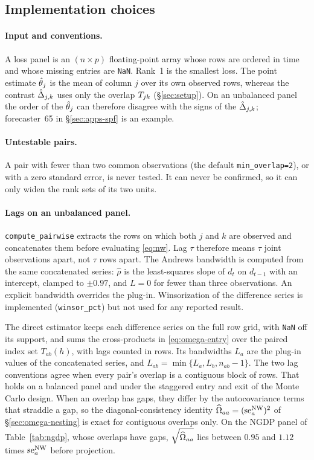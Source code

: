 \begin{appendix}
\tabImplCode

\section{Implementation choices}
\label{app:impl-details}

\paragraph{Input and conventions.} A loss panel is an $(n\times p)$ floating-point
array whose rows are ordered in time and whose missing entries are \texttt{NaN}. Rank~1
is the smallest loss. The point estimate $\hat{\theta}_j$ is the mean of column $j$ over
its own observed rows, whereas the contrast $\hat{\Delta}_{j,k}$ uses only the overlap
$T_{jk}$ (\S\ref{sec:setup}). On an unbalanced panel the order of the $\hat{\theta}_j$ can
therefore disagree with the signs of the $\hat{\Delta}_{j,k}$; forecaster~65 in
\S\ref{sec:apps-spf} is an example.

\paragraph{Untestable pairs.} A pair with fewer than two common observations (the
default \texttt{min\_overlap=2}), or with a zero standard error, is never tested. It
can never be confirmed, so it can only widen the rank sets of its two units.

\paragraph{Lags on an unbalanced panel.} \texttt{compute\_pairwise} extracts the rows
on which both $j$ and $k$ are observed and concatenates them before evaluating
\eqref{eq:nw}. Lag $\tau$ therefore means $\tau$ joint observations apart, not $\tau$
rows apart. The Andrews bandwidth is computed from the same concatenated series:
$\hat\rho$ is the least-squares slope of $d_t$ on $d_{t-1}$ with an intercept, clamped
to $\pm0.97$, and $L=0$ for fewer than three observations. An explicit bandwidth
overrides the plug-in. Winsorization of the difference series is implemented
(\texttt{winsor\_pct}) but not used for any reported result.

The direct estimator keeps each difference series on the full row grid, with
\texttt{NaN} off its support, and sums the cross-products in \eqref{eq:omega-entry} over
the paired index set $T_{ab}(h)$, with lags counted in rows. Its bandwidths $L_a$ are
the plug-in values of the concatenated series, and
$L_{ab}=\min\{L_a,L_b,n_{ab}-1\}$. The two lag conventions agree when every pair's
overlap is a contiguous block of rows. That holds on a balanced panel and under the
staggered entry and exit of the Monte Carlo design. When an overlap has gaps, they
differ by the autocovariance terms that straddle a gap, so the
diagonal-consistency identity $\widehat{\Omega}_{aa}=(\mathrm{se}^{\mathrm{NW}}_{a})^2$ of
\S\ref{sec:omega-nesting} is exact for contiguous overlaps only. On the NGDP panel of
Table~\ref{tab:ngdp}, whose overlaps have gaps, $\sqrt{\widehat{\Omega}_{aa}}$ lies between
$0.95$ and $1.12$ times $\mathrm{se}^{\mathrm{NW}}_{a}$ before projection.


\end{appendix}
